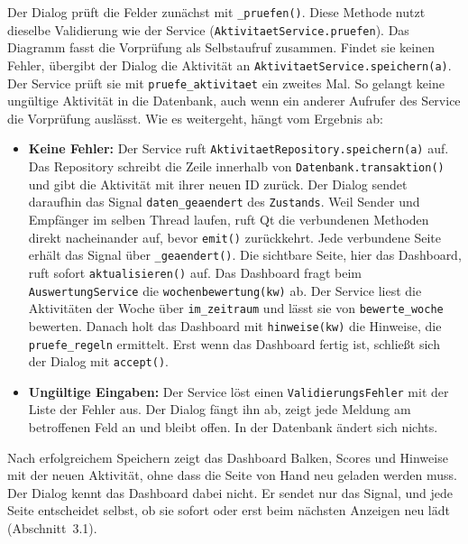 Der Dialog prüft die Felder zunächst mit \texttt{\_pruefen()}. Diese Methode nutzt dieselbe Validierung wie der Service (\texttt{AktivitaetService.pruefen}). Das Diagramm fasst die Vorprüfung als Selbstaufruf zusammen. Findet sie keinen Fehler, übergibt der Dialog die Aktivität an \texttt{AktivitaetService.speichern(a)}. Der Service prüft sie mit \texttt{pruefe\_aktivitaet} ein zweites Mal. So gelangt keine ungültige Aktivität in die Datenbank, auch wenn ein anderer Aufrufer des Service die Vorprüfung auslässt. Wie es weitergeht, hängt vom Ergebnis ab:
\begin{itemize}
  \item \textbf{Keine Fehler:} Der Service ruft \texttt{AktivitaetRepository.speichern(a)} auf. Das Repository schreibt die Zeile innerhalb von \texttt{Datenbank.transaktion()} und gibt die Aktivität mit ihrer neuen ID zurück. Der Dialog sendet daraufhin das Signal \texttt{daten\_geaendert} des \texttt{Zustands}. Weil Sender und Empfänger im selben Thread laufen, ruft Qt die verbundenen Methoden direkt nacheinander auf, bevor \texttt{emit()} zurückkehrt. Jede verbundene Seite erhält das Signal über \texttt{\_geaendert()}. Die sichtbare Seite, hier das Dashboard, ruft sofort \texttt{aktualisieren()} auf. Das Dashboard fragt beim \texttt{AuswertungService} die \texttt{wochenbewertung(kw)} ab. Der Service liest die Aktivitäten der Woche über \texttt{im\_zeitraum} und lässt sie von \texttt{bewerte\_woche} bewerten. Danach holt das Dashboard mit \texttt{hinweise(kw)} die Hinweise, die \texttt{pruefe\_regeln} ermittelt. Erst wenn das Dashboard fertig ist, schließt sich der Dialog mit \texttt{accept()}.
  \item \textbf{Ungültige Eingaben:} Der Service löst einen \texttt{ValidierungsFehler} mit der Liste der Fehler aus. Der Dialog fängt ihn ab, zeigt jede Meldung am betroffenen Feld an und bleibt offen. In der Datenbank ändert sich nichts.
\end{itemize}

Nach erfolgreichem Speichern zeigt das Dashboard Balken, Scores und Hinweise mit der neuen Aktivität, ohne dass die Seite von Hand neu geladen werden muss. Der Dialog kennt das Dashboard dabei nicht. Er sendet nur das Signal, und jede Seite entscheidet selbst, ob sie sofort oder erst beim nächsten Anzeigen neu lädt (Abschnitt~3.1).

